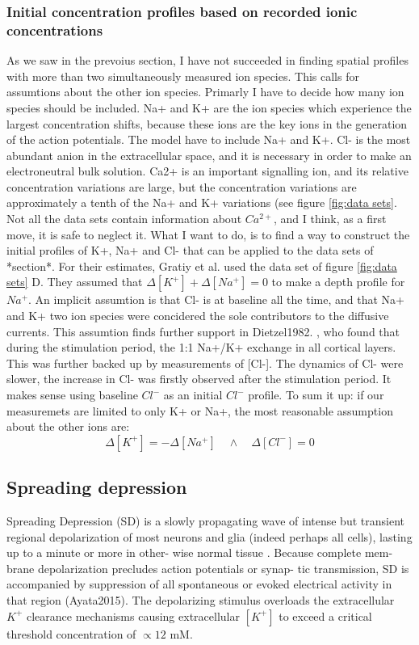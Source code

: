 \documentclass{article}
\begin{document}
\subsubsection{Initial concentration profiles based on recorded ionic concentrations}
As we saw in the prevoius section, I have not succeeded in finding spatial profiles with more than two simultaneously measured ion species. This calls for assumtions about the other ion species. Primarly I have to decide how many ion species should be included. Na+ and K+ are the ion species which experience the largest concentration shifts, because these ions are the key ions in the generation of the action potentials. The model have to include Na+ and K+. Cl- is the most abundant anion in the extracellular space, and it is necessary in order to make an electroneutral bulk solution. Ca2+ is an important signalling ion, and its relative concentration variations are large, but the concentration variations are approximately a tenth of the Na+ and K+ variations (see figure \ref{fig:data sets}. Not all the data sets contain information about $Ca^{2+}$, and I think, as a first move, it is safe to neglect it. What I want to do, is to find a way to construct the initial profiles of K+, Na+ and Cl- that can be applied to the data sets of *section*. For their estimates, Gratiy et al. used the data set of figure \ref{fig:data sets} D. They assumed that $\Delta [K^+] + \Delta [Na^+] = 0$ to make a depth profile for $Na^+$. An implicit assumtion is that Cl- is at baseline all the time, and that Na+ and K+ two ion species were concidered the sole contributors to the diffusive currents. This assumtion finds further support in Dietzel1982. , who found that during the stimulation period, the 1:1 Na+/K+ exchange in all cortical layers. This was further backed up by measurements of [Cl-]. The dynamics of Cl- were slower, the increase in Cl- was firstly observed after the stimulation period. It makes sense using baseline $Cl^-$ as an initial $Cl^-$ profile. 
To sum it up: if our measuremets are limited to only K+ or Na+, the most reasonable assumption about the other ions are:
 $$\Delta [K^+] =  -\Delta [Na^+] \quad \land \quad \Delta [Cl^-] =0$$ 

\subsection{Spreading depression}
Spreading Depression (SD) is a slowly propagating wave of intense but transient
regional depolarization of most neurons and glia (indeed
perhaps all cells), lasting up to a minute or more in other-
wise normal tissue . Because complete mem-
brane depolarization precludes action potentials or synap-
tic transmission, SD is accompanied by suppression of all
spontaneous or evoked electrical activity in that region (Ayata2015). The depolarizing stimulus overloads
the extracellular $K^+$ clearance mechanisms causing extracellular $[K^+]$ to exceed a critical threshold concentration of $\propto 12$ mM. 
\end{document}
